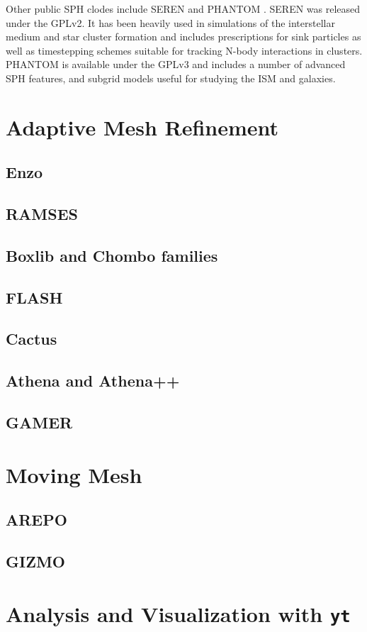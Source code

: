 \documentclass[11pt,twoside]{article}
\newcommand{\yt}{\texttt{yt}}
\begin{document}
Other public SPH clodes include SEREN \citep[\url{http://dhubber.github.io/seren},][]{hubber2011} and PHANTOM \citep[\url{https://phantomsph.bitbucket.io/},][]{price2017}. SEREN was released under the GPLv2. It has been heavily used in simulations of the interstellar medium and star cluster formation and includes prescriptions for sink particles \citep{walch2013} as well as timestepping schemes suitable for tracking N-body interactions in clusters. PHANTOM is available under the GPLv3 and includes a number of advanced SPH features, and subgrid models useful for studying the ISM and galaxies.

\section{Adaptive Mesh Refinement}
\label{amr}

\subsection{Enzo}
\label{enzo}

\subsection{RAMSES}
\label{ramses}

\subsection{Boxlib and Chombo families}
\label{boxlib}

\subsection{FLASH}
\label{flash}

\subsection{Cactus}
\label{cactus}

\subsection{Athena and Athena++}

\subsection{GAMER}

\section{Moving Mesh}
\label{usm}

\subsection{AREPO}
\label{arepo}


\subsection{GIZMO}
\label{gizmo}

\section{Analysis and Visualization with \yt\ }
\label{yt}


\end{document}
